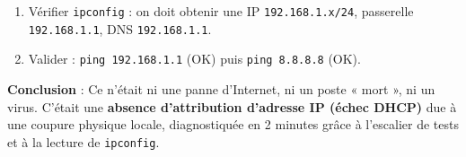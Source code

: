 \documentclass[11pt]{article}
\begin{document}
\begin{exoresolu}
\begin{enumerate}
\begin{enumerate}
            \begin{lstlisting}
C:\> ipconfig /release
C:\> ipconfig /renew
            \end{lstlisting}
      \item Vérifier \texttt{ipconfig} : on doit obtenir une IP \texttt{192.168.1.x/24}, passerelle \texttt{192.168.1.1}, DNS \texttt{192.168.1.1}.
      \item Valider : \texttt{ping 192.168.1.1} (OK) puis \texttt{ping 8.8.8.8} (OK).
      \end{enumerate}
\end{enumerate}
\textbf{Conclusion} : Ce n'était ni une panne d'Internet, ni un poste « mort », ni un virus. C'était une \textbf{absence d'attribution d'adresse IP (échec DHCP)} due à une coupure physique locale, diagnostiquée en 2 minutes grâce à l'escalier de tests et à la lecture de \texttt{ipconfig}.
\end{exoresolu}
\end{document}
